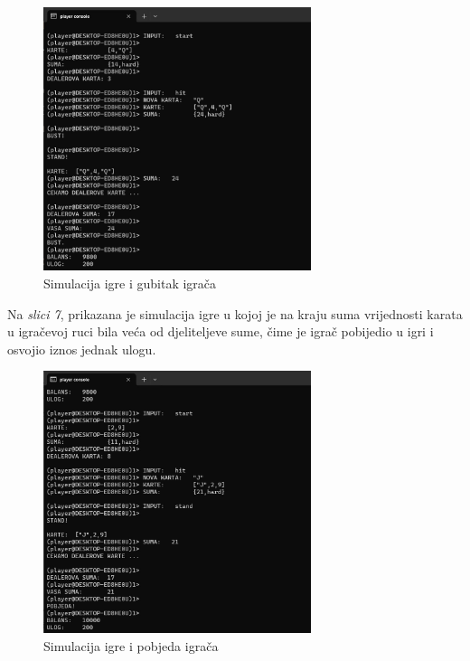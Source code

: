 \documentclass{IEEEcsmag}
\begin{document}
\begin{figure}[H]
\centerline{\includegraphics[width=18.5pc]{3.jpeg}}
\caption{Simulacija igre i gubitak igrača}
\vspace*{-5pt}
\end{figure}

Na \textit{slici 7}, prikazana je simulacija igre u kojoj je na kraju suma vrijednosti karata u igračevoj ruci bila veća od djeliteljeve sume, čime je igrač pobijedio u igri i osvojio iznos jednak ulogu.

\begin{figure}[H]
\centerline{\includegraphics[width=18.5pc]{4.jpeg}}
\caption{Simulacija igre i pobjeda igrača}
\vspace*{-5pt}
\end{figure}
\end{document}
